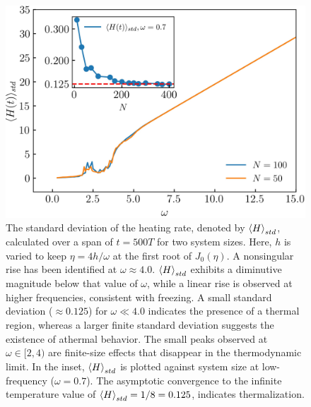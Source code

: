 \documentclass[%
reprint,
superscriptaddress,
amsmath,amssymb,
aps,
prb,
showkeys,
]{revtex4-2}
\begin{document}
\begin{figure}[!ht]
\centering
\includegraphics[width = 8.cm]{hbar_avg_std.jpeg}
\caption{The standard deviation of the heating rate, denoted by $\expval{H}_{std}$, calculated over a span of $t=500 T$ for two system sizes. Here, $h$ is varied to keep $\eta = 4h/\omega$ at the first root of $J_0(\eta)$. A nonsingular rise has been identified at $\omega \approx 4.0$. $\expval{H}_{std}$ exhibits a diminutive magnitude below that value of $\omega$, while a linear rise is observed at higher frequencies, consistent with freezing. A small standard deviation ($\approx 0.125$) for $\omega \ll 4.0$ indicates the presence of a thermal region, whereas a larger finite standard deviation suggests the existence of athermal behavior. The small peaks observed at $\omega\in [2, 4)$ are finite-size effects that disappear in the thermodynamic limit. In the inset, $\expval{H}_{std}$ is plotted against system size at low-frequency ($\omega=0.7$).   The asymptotic convergence to the infinite temperature value of $\expval{H}_{std} = 1/8 = 0.125$, indicates thermalization.}
\label{fig:havg_std}
\end{figure}
\end{document}
